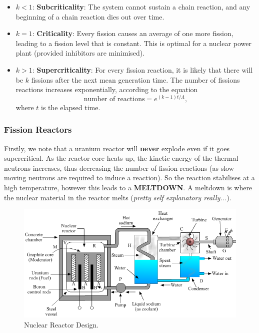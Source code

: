 \begin{itemize}
    \item $k<1$: \textbf{Subcriticality}: The system cannot sustain a chain reaction, and any beginning of a chain reaction dies out over time.
    \item $k = 1$: \textbf{Criticality}: Every fission causes an average of one more fission, leading to a fission level that is constant. This is optimal for a nuclear power plant (provided inhibitors are minimised).
    \item $k > 1$: \textbf{Supercriticality}: For every fission reaction, it is likely that there will be $k$ fissions after the next mean generation time. The number of fissions reactions increases exponentially, according to the equation
    \begin{equation}
        \text{number of reactions} = e^{(k-1)t/\Lambda},
    \end{equation}
    where $t$ is the elapsed time. 
\end{itemize}

\subsubsection*{Fission Reactors}

Firstly, we note that a uranium reactor will \textbf{never} explode even if it goes supercritical. As the reactor core heats up, the kinetic energy of the thermal neutrons increases, thus decreasing the number of fission reactions (as slow moving neutrons are required to induce a reaction). So the reaction stabilises at a high temperature, however this leads to a \textbf{MELTDOWN}. A meltdown is where the nuclear material in the reactor melts (\textit{pretty self explanatory really...}).

\begin{figure}[h!]
    \centering
    \includegraphics[scale=0.75]{notes/images/Reactor.JPG}
    \caption{Nuclear Reactor Design.}
\end{figure}
\FloatBarrier

